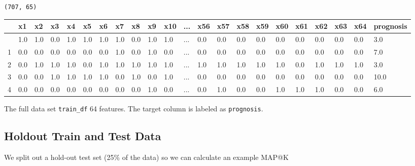 \documentclass[
  letterpaper,
  DIV=11,
  numbers=noendperiod]{scrreprt}
\begin{document}
\begin{verbatim}
(707, 65)
\end{verbatim}

\begin{longtable}[]{@{}llllllllllllllllllllll@{}}
\toprule\noalign{}
& x1 & x2 & x3 & x4 & x5 & x6 & x7 & x8 & x9 & x10 & ... & x56 & x57 &
x58 & x59 & x60 & x61 & x62 & x63 & x64 & prognosis \\
\midrule\noalign{}
\endhead
\bottomrule\noalign{}
\endlastfoot
0 & 1.0 & 1.0 & 0.0 & 1.0 & 1.0 & 1.0 & 1.0 & 0.0 & 1.0 & 1.0 & ... &
0.0 & 0.0 & 0.0 & 0.0 & 0.0 & 0.0 & 0.0 & 0.0 & 0.0 & 3.0 \\
1 & 0.0 & 0.0 & 0.0 & 0.0 & 0.0 & 0.0 & 1.0 & 0.0 & 1.0 & 0.0 & ... &
0.0 & 0.0 & 0.0 & 0.0 & 0.0 & 0.0 & 0.0 & 0.0 & 0.0 & 7.0 \\
2 & 0.0 & 1.0 & 1.0 & 1.0 & 0.0 & 1.0 & 1.0 & 1.0 & 1.0 & 1.0 & ... &
1.0 & 1.0 & 1.0 & 1.0 & 1.0 & 0.0 & 1.0 & 1.0 & 1.0 & 3.0 \\
3 & 0.0 & 0.0 & 1.0 & 1.0 & 1.0 & 1.0 & 0.0 & 1.0 & 0.0 & 1.0 & ... &
0.0 & 0.0 & 0.0 & 0.0 & 0.0 & 0.0 & 0.0 & 0.0 & 0.0 & 10.0 \\
4 & 0.0 & 0.0 & 0.0 & 0.0 & 0.0 & 0.0 & 0.0 & 0.0 & 1.0 & 0.0 & ... &
0.0 & 1.0 & 0.0 & 0.0 & 1.0 & 1.0 & 1.0 & 0.0 & 0.0 & 6.0 \\
\end{longtable}

The full data set \texttt{train\_df} 64 features. The target column is
labeled as \texttt{prognosis}.

\hypertarget{holdout-train-and-test-data-2}{%
\subsection{Holdout Train and Test
Data}\label{holdout-train-and-test-data-2}}

We split out a hold-out test set (25\% of the data) so we can calculate
an example MAP@K
\end{document}
